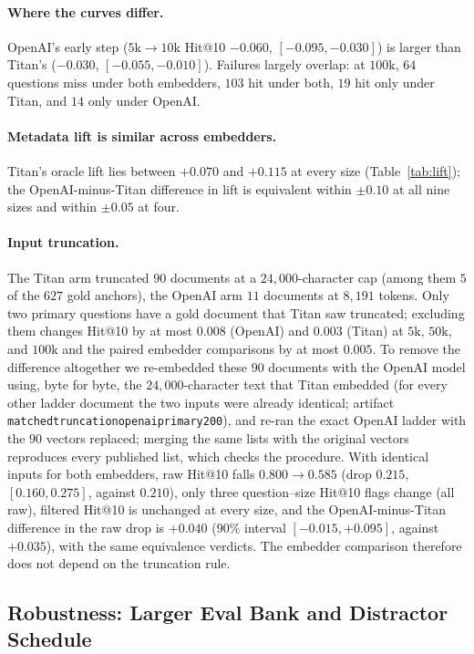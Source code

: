 \documentclass{ieeeaccess}
\makeatletter
\DeclareRobustCommand{\_}{\ifmmode\nfss@text{\textunderscore}\else\textunderscore\allowbreak\fi}
\makeatother
\begin{document}
\paragraph{Where the curves differ.}
OpenAI's early step ($5\text{k}{\to}10\text{k}$ Hit@10 $-0.060$, $[-0.095,-0.030]$) is larger than Titan's ($-0.030$, $[-0.055,-0.010]$). Failures largely overlap: at $100\text{k}$, $64$ questions miss under both embedders, $103$ hit under both, $19$ hit only under Titan, and $14$ only under OpenAI.

\paragraph{Metadata lift is similar across embedders.}
Titan's oracle lift lies between $+0.070$ and $+0.115$ at every size (Table~\ref{tab:lift}); the OpenAI-minus-Titan difference in lift is equivalent within $\pm0.10$ at all nine sizes and within $\pm0.05$ at four.

\paragraph{Input truncation.}
The Titan arm truncated $90$ documents at a $24{,}000$-character cap (among them $5$ of the $627$ gold anchors), the OpenAI arm $11$ documents at $8{,}191$ tokens. Only two primary questions have a gold document that Titan saw truncated; excluding them changes Hit@10 by at most $0.008$ (OpenAI) and $0.003$ (Titan) at $5\text{k}$, $50\text{k}$, and $100\text{k}$ and the paired embedder comparisons by at most $0.005$. To remove the difference altogether we re-embedded these $90$ documents with the OpenAI model using, byte for byte, the $24{,}000$-character text that Titan embedded (for every other ladder document the two inputs were already identical; artifact \texttt{matched\_truncation\_openai\_primary200}), and re-ran the exact OpenAI ladder with the $90$ vectors replaced; merging the same lists with the original vectors reproduces every published list, which checks the procedure. With identical inputs for both embedders, raw Hit@10 falls $0.800{\to}0.585$ (drop $0.215$, $[0.160,0.275]$, against $0.210$), only three question--size Hit@10 flags change (all raw), filtered Hit@10 is unchanged at every size, and the OpenAI-minus-Titan difference in the raw drop is $+0.040$ ($90\%$ interval $[-0.015,+0.095]$, against $+0.035$), with the same equivalence verdicts. The embedder comparison therefore does not depend on the truncation rule.

\subsection{Robustness: Larger Eval Bank and Distractor Schedule}
\label{sec:robust}
\end{document}
